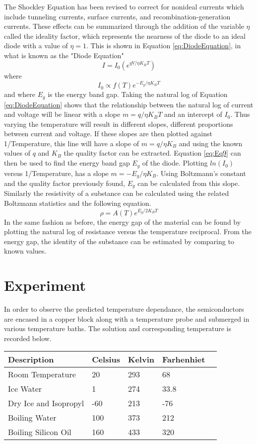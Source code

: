 \documentclass[twocolumn,11pt]{article}
\newcommand{\beq}{\begin{equation}}
\newcommand{\eeq}{\end{equation}}
\begin{document}
The Shockley Equation has been revised to correct for nonideal currents which include tunneling currents, surface currents, and recombination-generation currents. These effects can be summarized through the addition of the variable $\eta$ called the ideality factor, which represents the nearness of the diode to an ideal diode with a value of $\eta =1$. This is shown in Equation \ref{eq:DiodeEquation}, in what is known as the "Diode Equation"
\beq
I=I_0\left(e^{qV/\eta{}K_BT}\right)
\label{eq:DiodeEquation}
\eeq
where
\beq
I_0 \propto f\left(T\right)e^{-E_g/\eta{}K_BT}
\label{eq:Eq9}
\eeq
and where $E_g$ is the energy band gap.
Taking the natural log of Equation \ref{eq:DiodeEquation} shows that the relationship between the natural log of current and voltage will be linear with a slope $m=q/\eta{}K_BT$ and an intercept of $I_0$. Thus varying the temperature will result in different slopes, different proportions between current and voltage. If these slopes are then plotted against 1/Temperature, this line will have a slope of $m=q/\eta{}K_B$ and using the known values of $q$ and $K_B$ the quality factor can be extracted. Equation \ref{eq:Eq9} can then be used to find the energy band gap $E_g$ of the diode. Plotting $ln\left(I_0\right)$ versus 1/Temperature, has a slope $m=-E_g/\eta{}K_B$. Using Boltzmann's constant and the quality factor previously found, $E_g$ can be calculated from this slope.
Similarly the resistivity of a substance can be calculated using the related Boltzmann statistics and the following equation.
\beq
\rho{}=A\left(T\right)e^{E_g/2K_BT}
\label{eq:Resistivity}
\eeq
In the same fashion as before, the energy gap of the material can be found by plotting the natural log of resistance versus the temperature reciprocal. From the energy gap, the identity of the substance can be estimated by comparing to known values.
\section*{Experiment}
In order to observe the predicted temperature dependance, the semiconductors are encased in a copper block along with a temperature probe and submerged in various temperature baths. The solution and corresponding temperature is recorded below.


\begin{tabular}{|l|l|l|l|l|}
\hline
  Description & Celsius & Kelvin & Farhenhiet \\ \hline
 \hline
  Room Temperature & 20 & 293 & 68\\ \hline
  \hline
   Ice Water & 1 & 274 & 33.8 \\ \hline
  \hline
   Dry Ice and Isopropyl &-60 & 213 & -76 \\ \hline
  \hline
   Boiling Water & 100 & 373 & 212\\ \hline
  \hline
   Boiling Silicon Oil & 160 & 433 & 320 \\ \hline
  \hline
\end{tabular}
\end{document}
